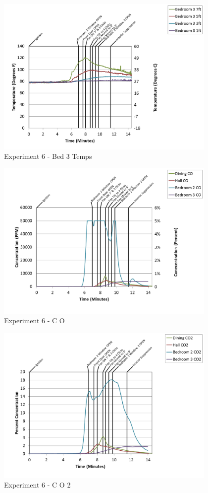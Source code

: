 \documentclass{article}
\begin{document}
\begin{appendices}
\clearpage

\begin{figure}[h!]
	\centering
	\includegraphics[height=3.05in]{0_Images/Results_Charts/Exp_6_Charts/Bed3Temps.png}
	\caption{Experiment 6 - Bed 3 Temps}
\end{figure}


\begin{figure}[h!]
	\centering
	\includegraphics[height=3.05in]{0_Images/Results_Charts/Exp_6_Charts/CO.png}
	\caption{Experiment 6 - C O}
\end{figure}

\clearpage

\begin{figure}[h!]
	\centering
	\includegraphics[height=3.05in]{0_Images/Results_Charts/Exp_6_Charts/CO2.png}
	\caption{Experiment 6 - C O 2}
\end{figure}



\end{appendices}
\end{document}

